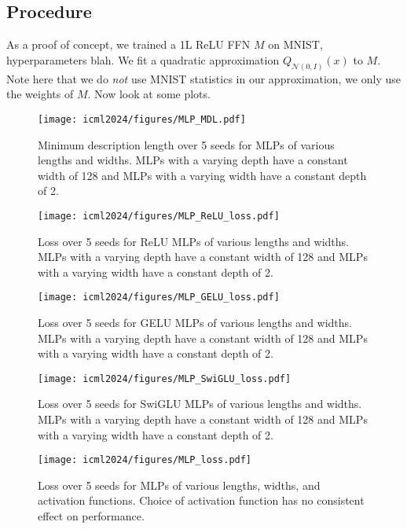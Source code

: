 \documentclass{article}
\theoremstyle{plain}
\theoremstyle{definition}
\theoremstyle{remark}
\begin{document}
\subsection{Procedure}
As a proof of concept, we trained a 1L ReLU FFN $M$ on MNIST, hyperparameters blah.
We fit a quadratic approximation $Q_{\mathcal{N}(0,I)}(x)$ to $M$. Note here that we do \emph{not} use MNIST statistics in our approximation, we only use the weights of $M$. Now look at some plots.

\begin{figure}[h]
    \centering
    \texttt{[image: icml2024/figures/MLP\_MDL.pdf]}
    \caption{Minimum description length over 5 seeds for MLPs of various lengths and widths. MLPs with a varying depth have a constant width of 128 and MLPs with a varying width have a constant depth of 2.}
    \label{fig:mlp_mdl}
\end{figure}

\begin{figure}[h]
    \centering
    \texttt{[image: icml2024/figures/MLP\_ReLU\_loss.pdf]}
    \caption{Loss over 5 seeds for ReLU MLPs of various lengths and widths. MLPs with a varying depth have a constant width of 128 and MLPs with a varying width have a constant depth of 2.}
    \label{fig:mlp_relu}
\end{figure}

\begin{figure}[h]
    \centering
    \texttt{[image: icml2024/figures/MLP\_GELU\_loss.pdf]}
    \caption{Loss over 5 seeds for GELU MLPs of various lengths and widths. MLPs with a varying depth have a constant width of 128 and MLPs with a varying width have a constant depth of 2.}
    \label{fig:mlp_gelu}
\end{figure}

\begin{figure}[h]
    \centering
    \texttt{[image: icml2024/figures/MLP\_SwiGLU\_loss.pdf]}
    \caption{Loss over 5 seeds for SwiGLU MLPs of various lengths and widths. MLPs with a varying depth have a constant width of 128 and MLPs with a varying width have a constant depth of 2.}
    \label{fig:mlp_swiglu}
\end{figure}

\begin{figure}[h]
    \centering
    \texttt{[image: icml2024/figures/MLP\_loss.pdf]}
    \caption{Loss over 5 seeds for MLPs of various lengths, widths, and activation functions. Choice of activation function has no consistent effect on performance.}
    \label{fig:mlp_activations}
\end{figure}
\end{document}
